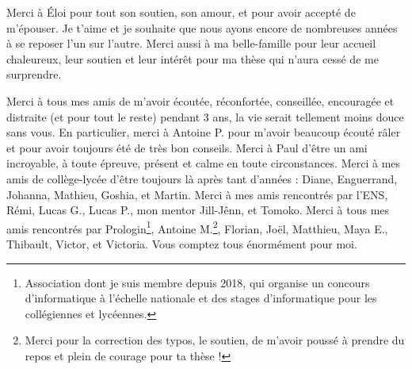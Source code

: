 Merci à Éloi pour tout son soutien, son amour, et pour avoir accepté de m’épouser. Je t’aime et je souhaite que nous ayons encore de nombreuses années à se reposer l’un sur l’autre. Merci aussi à ma belle-famille pour leur accueil chaleureux, leur soutien et leur intérêt pour ma thèse qui n’aura cessé de me surprendre.


Merci à tous mes amis de m’avoir écoutée, réconfortée, conseillée, encouragée et distraite (et pour tout le reste) pendant 3 ans, la vie serait tellement moins douce sans vous.
En particulier, merci à Antoine P. pour m’avoir beaucoup écouté râler et pour avoir toujours été de très bon conseils. Merci à Paul d’être un ami incroyable, à toute épreuve, présent et calme en toute circonstances. Merci à mes amis de collège-lycée d’être toujours là après tant d’années : Diane, Enguerrand, Johanna, Mathieu, Goshia, et Martin. Merci à mes amis rencontrés par l’ENS, Rémi, Lucas G., Lucas P., mon mentor Jill-Jênn, et Tomoko. Merci à tous mes amis rencontrés par Prologin\footnote{Association dont je suis membre depuis 2018, qui organise un concours d’informatique à l’échelle nationale et des stages d’informatique pour les collégiennes et lycéennes.}, Antoine M.\footnote{Merci pour la correction des typos, le soutien, de m'avoir poussé à prendre du repos et plein de courage pour ta thèse !}, Florian, Joël, Matthieu, Maya E., Thibault, Victor, et Victoria. Vous comptez tous énormément pour moi.
